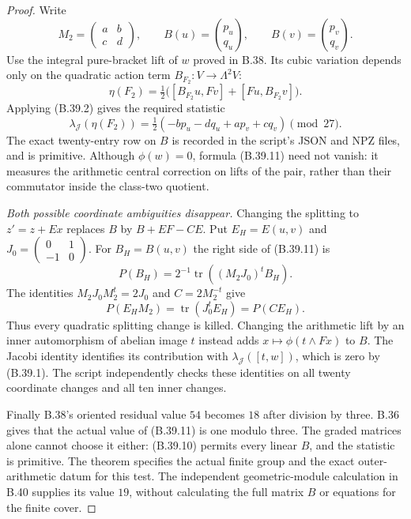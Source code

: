 \begin{proof}
Write
\[
 M_2=\begin{pmatrix}a&b\\c&d\end{pmatrix},
 \qquad B(u)=\binom{p_u}{q_u},
 \qquad B(v)=\binom{p_v}{q_v}.
\]
Use the integral pure-bracket lift of $w$ proved
in B.38. Its cubic variation depends only on the
quadratic action term $B_{F_2}:V\to\Lambda^2V$:
\[
 \eta(F_2)=\tfrac12
     \bigl([B_{F_2}u,Fv]+[Fu,B_{F_2}v]\bigr).
\]
Applying (B.39.2) gives the required statistic
\[
 \boxed{
 \lambda_{\mathcal J}(\eta(F_2))
     =\tfrac12(-bp_u-dq_u+ap_v+cq_v)\pmod{27}.}
                                                               \tag{B.39.11}
\]
The exact twenty-entry row on $B$ is recorded in
the script's JSON and NPZ files, and is primitive.
Although $\phi(w)=0$, formula (B.39.11) need not
vanish: it measures the arithmetic central correction
on lifts of the pair, rather than their commutator
inside the class-two quotient.

\emph{Both possible coordinate ambiguities disappear.}
Changing the splitting to $z'=z+Ex$ replaces $B$ by
$B+EF-CE$.
Put $E_H=E(u,v)$ and
$J_0=\left(\begin{smallmatrix}0&1\\-1&0\end{smallmatrix}\right)$.
For $B_H=B(u,v)$ the right side of (B.39.11) is
\[
               P(B_H)=2^{-1}
                   \operatorname{tr}((M_2J_0)^tB_H).
\]
The identities $M_2J_0M_2^t=2J_0$ and
$C=2M_2^{-t}$ give
\[
 P(E_HM_2)=\operatorname{tr}(J_0^tE_H)=P(CE_H).
\]
Thus every quadratic splitting change is killed.
Changing the arithmetic lift by an inner automorphism
of abelian image $t$ instead adds
$x\mapsto\phi(t\wedge Fx)$ to $B$.
The Jacobi identity identifies its contribution
with $\lambda_{\mathcal J}([t,w])$, which is zero
by (B.39.1). The script independently checks these
identities on all twenty coordinate changes and
all ten inner changes.

Finally B.38's oriented residual value $54$ becomes
$18$ after division by three. B.36 gives that the
actual value of (B.39.11) is one modulo three.
The graded matrices alone cannot choose it either:
(B.39.10) permits every linear $B$, and the statistic
is primitive. The theorem specifies the actual finite
group and the exact outer-arithmetic datum for this
test. The independent geometric-module calculation in
B.40 supplies its value $19$, without calculating the
full matrix $B$ or equations for the finite cover.
\end{proof}
